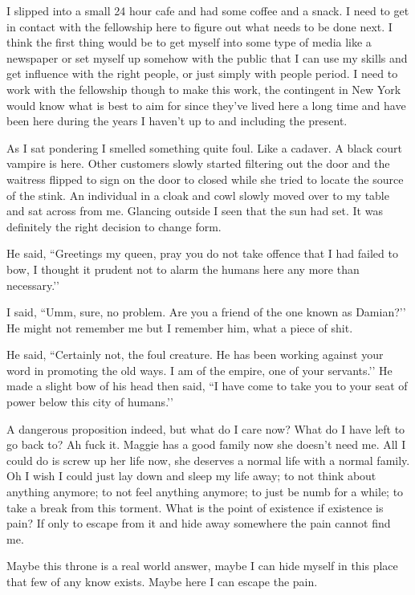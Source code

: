 I slipped into a small 24 hour cafe and had some coffee and a snack. I need to get in contact with the fellowship here to figure out what needs to be done next. I think the first thing would be to get myself into some type of media like a newspaper or set myself up somehow with the public that I can use my skills and get influence with the right people, or just simply with people period. I need to work with the fellowship though to make this work, the contingent in New York would know what is best to aim for since they’ve lived here a long time and have been here during the years I haven’t up to and including the present.

As I sat pondering I smelled something quite foul. Like a cadaver. A black court vampire is here. Other customers slowly started filtering out the door and the waitress flipped to sign on the door to closed while she tried to locate the source of the stink. An individual in a cloak and cowl slowly moved over to my table and sat across from me. Glancing outside I seen that the sun had set. It was definitely the right decision to change form.

He said, ``Greetings my queen, pray you do not take offence that I had failed to bow, I thought it prudent not to alarm the humans here any more than necessary.’’

I said, ``Umm, sure, no problem. Are you a friend of the one known as Damian?’’ He might not remember me but I remember him, what a piece of shit.

He said, ``Certainly not, the foul creature. He has been working against your word in promoting the old ways. I am of the empire, one of your servants.’’ He made a slight bow of his head then said, ``I have come to take you to your seat of power below this city of humans.’’

A dangerous proposition indeed, but what do I care now? What do I have left to go back to? Ah fuck it. Maggie has a good family now she doesn't need me. All I could do is screw up her life now, she deserves a normal life with a normal family. Oh I wish I could just lay down and sleep my life away; to not think about anything anymore; to not feel anything anymore; to just be numb for a while; to take a break from this torment. What is the point of existence if existence is pain? If only to escape from it and hide away somewhere the pain cannot find me.

Maybe this throne is a real world answer, maybe I can hide myself in this place that few of any know exists. Maybe here I can escape the pain.




 